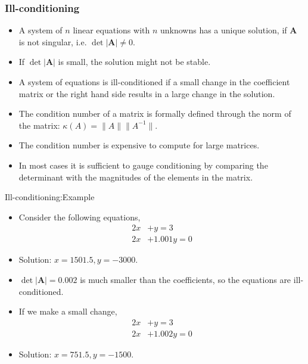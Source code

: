 \documentclass{beamer}
\begin{document}
\begin{frame}[fragile]
\frametitle{Ill-conditioning}
\begin{itemize}
\item A system of $n$ linear equations with  $n$ unknowns has a unique solution, if $\mathbf{A}$ is not singular, i.e. $\det|\mathbf{A}|\ne 0$. 
\item If  $\det|\mathbf{A}|$ is small, the solution might not be stable. 
\item 
A system of equations is  \alert{ill-conditioned} if a \alert{small change} in the 
coefficient matrix or  the right hand side results in a \alert{large change} in the 
solution.
\item The condition number of a matrix is formally defined through the \alert{norm} of the matrix:
$\kappa(A)=\|A \|\|A^{-1}\|$.
\item The condition number is \alert{expensive} to compute for large matrices. 
\item In most cases it is sufficient to gauge conditioning by comparing the \alert{determinant} with the \alert{magnitudes of the elements} in the matrix.
\end{itemize}
\end{frame}
\begin{frame}{Ill-conditioning:Example}
\begin{itemize}
\item Consider the following equations,
\begin{align*}
2x&+y =3 \\
2x&+1.001y =0
\end{align*}
\item Solution: $x=1501.5, y=-3000$.
\item $\operatorname{det}|\mathbf{A}|=0.002$ is much smaller than the coefficients, so the equations are ill-conditioned.
\item If we make a small change,
\begin{align*}
2x&+y =3 \\
2x&+1.002y =0
\end{align*}
\item Solution: $x = 751.5, y = -1500$.
\end{itemize}
\end{frame}
\end{document}
